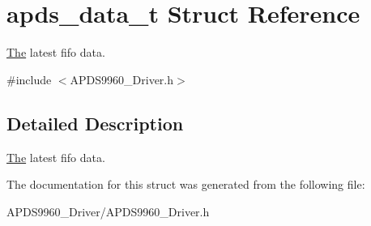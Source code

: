 \hypertarget{structapds__data__t}{}\section{apds\+\_\+data\+\_\+t Struct Reference}
\label{structapds__data__t}


\hyperlink{structThe}{The} latest fifo data.  




{\ttfamily \#include $<$A\+P\+D\+S9960\+\_\+\+Driver.\+h$>$}



\subsection{Detailed Description}
\hyperlink{structThe}{The} latest fifo data. 

The documentation for this struct was generated from the following file\+:\begin{DoxyCompactItemize}
\item 
A\+P\+D\+S9960\+\_\+\+Driver/A\+P\+D\+S9960\+\_\+\+Driver.\+h\end{DoxyCompactItemize}
